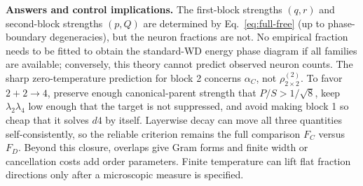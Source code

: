 \documentclass[10pt]{article}
\begin{document}
\textbf{Answers and control implications.}
The first-block strengths $(q,r)$ and second-block strengths $(p,Q)$ are determined by
Eq.~\eqref{eq:full-free} (up to phase-boundary degeneracies), but the neuron fractions are not.
No empirical fraction needs to be fitted to obtain the standard-WD energy phase diagram if all
families are available; conversely, this theory cannot predict observed neuron counts.  The
sharp zero-temperature prediction for block 2 concerns $\alpha_C$, not
$\rho^{(2)}_{2\times2}$.  To favor $2+2\to4$, preserve enough canonical-parent strength that
$P/S>1/\sqrt8$, keep $\lambda_2\lambda_4$ low enough that the target is not suppressed, and
avoid making block 1 so cheap that it solves $d4$ by itself.  Layerwise decay can move all
three quantities self-consistently, so the reliable criterion remains the full comparison
$F_C$ versus $F_D$.  Beyond this closure, overlaps give Gram forms and finite width or
cancellation costs add order parameters.  Finite temperature can lift flat fraction directions
only after a microscopic measure is specified.
\end{document}
